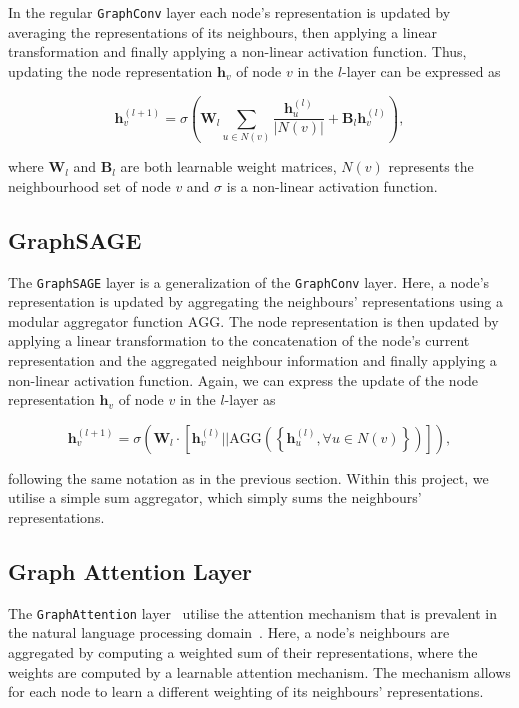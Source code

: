 \documentclass[10pt,conference,compsocconf]{IEEEtran}
\begin{document}
In the regular \texttt{GraphConv} layer each node's representation is updated by
averaging the representations of its neighbours, then applying a linear
transformation and finally applying a non-linear activation function. Thus,
updating the node representation $\mathbf{h}_v$ of node $v$ in the $l$-layer can
be expressed as

\begin{equation}
  \mathbf{h}_v^{(l+1)} = \sigma\left( \mathbf{W}_l \sum_{u\in N(v)}
  \frac{\mathbf{h}_u^{(l)}}{|N(v)|} + \mathbf{B}_l \mathbf{h}_v^{(l)} \right),
\end{equation}

where $\mathbf{W}_l$ and $\mathbf{B}_l$ are both learnable weight matrices,
$N(v)$ represents the neighbourhood set of node $v$ and $\sigma$ is a non-linear
activation function.

\subsection{GraphSAGE}
 
The \texttt{GraphSAGE} layer is a generalization of the \texttt{GraphConv}
layer. Here, a node's representation is updated by aggregating the neighbours'
representations using a modular aggregator function $\mathrm{AGG}$. The node
representation is then updated by applying a linear transformation to the
concatenation of the node's current representation and the aggregated neighbour
information and finally applying a non-linear activation function. Again, we can
express the update of the node representation $\mathbf{h}_v$ of node $v$ in the
$l$-layer as

\begin{equation}
  \mathbf{h}_v^{(l+1)} = \sigma\left( \mathbf{W}_l \cdot
  \left[\mathbf{h}_v^{(l)} || \mathrm{AGG} \left(\left\{\mathbf{h}_u^{(l)}, \forall u\in N(v) \right\}\right) \right] \right),
\end{equation}

following the same notation as in the previous section. Within this project, we
utilise a simple sum aggregator, which simply sums the neighbours'
representations.

\subsection{Graph Attention Layer}

The \texttt{GraphAttention} layer~\cite{graphatt} utilise the attention
mechanism that is prevalent in the natural language processing
domain~\cite{attention}. Here, a node's neighbours are aggregated by computing a
weighted sum of their representations, where the weights are computed by a
learnable attention mechanism. The mechanism allows for each node to learn a
different weighting of its neighbours' representations.
\end{document}

